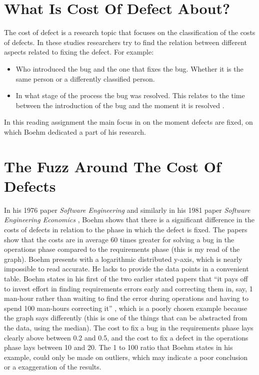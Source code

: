 \section*{What Is Cost Of Defect About?}

The cost of defect is a research topic that focuses on the classification of the costs of defects.
In these studies researchers try to find the relation between different aspects related to fixing the defect.
For example:
\begin{itemize}[noitemsep]
\item Who introduced the bug and the one that fixes the bug. Whether it is the same person or a differently classified person.
\item In what stage of the process the bug was resolved. This relates to the time between the introduction of the bug and the moment it is resolved \autocite{boehm1976software}.
\end{itemize}

In this reading assignment the main focus in on the moment defects are fixed, on which Boehm dedicated a part of his research.


\section*{The Fuzz Around The Cost Of Defects}

In his 1976 paper \textit{Software Engineering} \autocite{boehm1976software} and similarly in his 1981 paper \textit{Software Engineering Economics} \autocite{boehm1981software},
Boehm shows that there is a significant difference in the costs of defects in relation to the phase in which the defect is fixed.
The papers show that the costs are in average 60 times greater for solving a bug in the operations phase compared to the requirements phase (this is my read of the graph).
Boehm presents with a logarithmic distributed y-axis, which is nearly impossible to read accurate. He lacks to provide the data points in a convenient table.
Boehm states in his first of the two earlier stated papers that
``it pays off to invest effort in finding requirements errors early and
correcting them in, say, 1 man-hour rather than waiting to find the error during operations
and having to spend 100 man-hours correcting it'' \autocite[4]{boehm1976software}, which is a poorly chosen example because the graph says differently (this is one of the things that can be abstracted from the data, using the median).
The cost to fix a bug in the requirements phase lays clearly above between 0.2 and 0.5, and the cost to fix a defect in the operations phase lays between 10 and 20.
The 1 to 100 ratio that Boehm states in his example, could only be made on outliers, which may indicate a poor conclusion or a exaggeration of the results.

